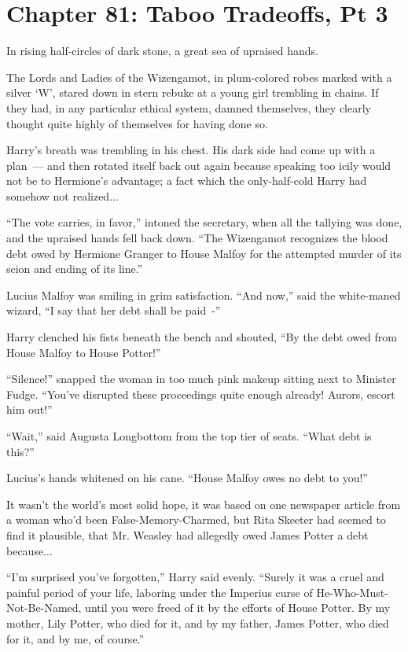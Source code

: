 \chapter{Chapter 81: Taboo Tradeoffs, Pt 3}
In rising half-circles of dark stone, a great sea of upraised hands.

The Lords and Ladies of the Wizengamot, in plum-colored robes marked with a silver `W', stared down in stern rebuke at a young girl trembling in chains. If they had, in any particular ethical system, damned themselves, they clearly thought quite highly of themselves for having done so.

Harry's breath was trembling in his chest. His dark side had come up with a plan~--- and then rotated itself back out again because speaking too icily would not be to Hermione's advantage; a fact which the only-half-cold Harry had somehow not realized...

``The vote carries, in favor,'' intoned the secretary, when all the tallying was done, and the upraised hands fell back down. ``The Wizengamot recognizes the blood debt owed by Hermione Granger to House Malfoy for the attempted murder of its scion and ending of its line.''

Lucius Malfoy was smiling in grim satisfaction. ``And now,'' said the white-maned wizard, ``I say that her debt shall be paid~-''

Harry clenched his fists beneath the bench and shouted, ``By the debt owed from House Malfoy to House Potter!''

``Silence!'' snapped the woman in too much pink makeup sitting next to Minister Fudge. ``You've disrupted these proceedings quite enough already! Aurors, escort him out!''

``Wait,'' said Augusta Longbottom from the top tier of seats. ``What debt is this?''

Lucius's hands whitened on his cane. ``House Malfoy owes no debt to you!''

It wasn't the world's most solid hope, it was based on one newspaper article from a woman who'd been False-Memory-Charmed, but Rita Skeeter had seemed to find it plausible, that Mr. Weasley had allegedly owed James Potter a debt because...

``I'm surprised you've forgotten,'' Harry said evenly. ``Surely it was a cruel and painful period of your life, laboring under the Imperius curse of He-Who-Must-Not-Be-Named, until you were freed of it by the efforts of House Potter. By my mother, Lily Potter, who died for it, and by my father, James Potter, who died for it, and by me, of course.''

